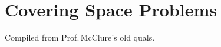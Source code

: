 \chapter{Covering Space Problems}
Compiled from Prof.\,McClure's old quals.
\begin{problem}
\end{problem}

